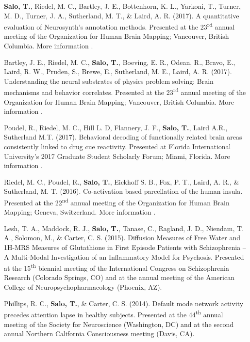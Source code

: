 \documentclass[10pt]{article}
\newcommand{\textlink}[3][blue]{\href{#2}{\color{#1}{#3}}}
\begin{document}
\begin{hangparas}{.25in}{1}
	\bigskip

	\textbf{Salo, T.}, Riedel, M. C., Bartley, J. E., Bottenhorn, K. L., Yarkoni, T.,
	Turner, M. D., Turner, J. A., Sutherland, M. T., \& Laird, A. R. (2017).
	A quantitative evaluation of Neurosynth's annotation methods. Presented at
	the 23\textsuperscript{rd} annual meeting of the Organization for Human Brain
	Mapping; Vancouver, British Columbia.
	More information
	\textlink{https://nbclab.github.io/posters/salo-neurosynth-poster}{here}.

	\bigskip

	Bartley, J. E., Riedel, M. C., \textbf{Salo, T.}, Boeving, E. R., Odean, R.,
	Bravo, E., Laird, R. W., Pruden, S., Brewe, E., Sutherland, M. E.,
	Laird, A. R. (2017).
	Understanding the neural substrates of physics problem solving: Brain
	mechanisms and behavior correlates. Presented at the 23\textsuperscript{rd}
	annual meeting of the Organization for Human Brain Mapping; Vancouver, British
	Columbia.
	More information
	\textlink{https://nbclab.github.io/posters/bartley-physics-poster}{here}.

	\bigskip

	Poudel, R.,  Riedel, M. C., Hill L. D, Flannery, J. F., \textbf{Salo, T.},
	Laird A.R., Sutherland M.T. (2017).
	Behavioral decoding of functionally related brain areas consistently linked
	to drug cue reactivity.
	Presented at Florida International University's 2017 Graduate Student
	Scholarly Forum; Miami, Florida.
	More information
	\textlink{https://nbclab.github.io/posters/poudel-cue-reactivity-poster}{here}.

	\bigskip

	Riedel, M. C., Poudel, R., \textbf{Salo, T.}, Eickhoff S. B., Fox, P. T.,
	Laird, A. R., \& Sutherland, M. T. (2016).
	Co-activation based parcellation of the human insula.
	Presented at the 22\textsuperscript{nd} annual meeting of the Organization
	for Human Brain Mapping; Geneva, Switzerland.
	More information
	\textlink{https://osf.io/pqvqy}{here}.

	\bigskip

	Lesh, T. A., Maddock, R. J., \textbf{Salo, T.}, Tanase, C., Ragland, J. D.,
	Niendam, T. A., Solomon, M., \& Carter, C. S. (2015).
	Diffusion Measures of Free Water and 1H-MRS Measures of Glutathione in First
	Episode Patients with Schizophrenia -- A Multi-Modal Investigation of an
	Inflammatory Model for Psychosis.
	Presented at the 15\textsuperscript{th} biennial meeting of the International
	Congress on Schizophrenia Research (Colorado Springs, CO) and at
	the annual meeting of the American College of Neuropsychopharmacology
	(Phoenix, AZ).

	\bigskip

	Phillips, R. C., \textbf{Salo, T.}, \& Carter, C. S. (2014).
	Default mode network activity precedes attention lapse in healthy subjects.
	Presented at the 44\textsuperscript{th} annual meeting of the Society for
	Neuroscience (Washington, DC) and at the second annual Northern California
	Consciousness meeting (Davis, CA).

\end{hangparas}
\end{document}
